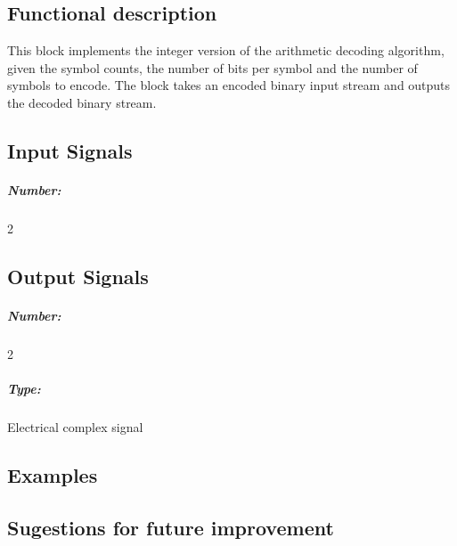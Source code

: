 \subsection*{Functional description}

This block implements the integer version of the arithmetic decoding algorithm, given the symbol counts, the number of bits per symbol and the number of symbols to encode.
The block takes an encoded binary input stream and outputs the decoded binary stream.


\pagebreak
\subsection*{Input Signals}

\subparagraph*{Number:} 2

\subsection*{Output Signals}

\subparagraph*{Number:} 2

\subparagraph*{Type:} Electrical complex signal

\subsection*{Examples}

\subsection*{Sugestions for future improvement}


